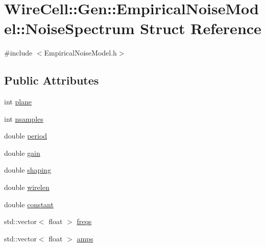 \hypertarget{struct_wire_cell_1_1_gen_1_1_empirical_noise_model_1_1_noise_spectrum}{}\section{Wire\+Cell\+:\+:Gen\+:\+:Empirical\+Noise\+Model\+:\+:Noise\+Spectrum Struct Reference}
\label{struct_wire_cell_1_1_gen_1_1_empirical_noise_model_1_1_noise_spectrum}


{\ttfamily \#include $<$Empirical\+Noise\+Model.\+h$>$}

\subsection*{Public Attributes}
\begin{DoxyCompactItemize}
\item 
int \hyperlink{struct_wire_cell_1_1_gen_1_1_empirical_noise_model_1_1_noise_spectrum_af4b3a452d3cc525401482d214132565a}{plane}
\item 
int \hyperlink{struct_wire_cell_1_1_gen_1_1_empirical_noise_model_1_1_noise_spectrum_a29ae414d6739f6d639dfee7e7540a404}{nsamples}
\item 
double \hyperlink{struct_wire_cell_1_1_gen_1_1_empirical_noise_model_1_1_noise_spectrum_aed82c7a61bd3901c3ad7dce02041f51e}{period}
\item 
double \hyperlink{struct_wire_cell_1_1_gen_1_1_empirical_noise_model_1_1_noise_spectrum_ad3b40eb570b2ccbb93fee79da5b4817c}{gain}
\item 
double \hyperlink{struct_wire_cell_1_1_gen_1_1_empirical_noise_model_1_1_noise_spectrum_ab76b726184c0744b3b16e8bc0483a662}{shaping}
\item 
double \hyperlink{struct_wire_cell_1_1_gen_1_1_empirical_noise_model_1_1_noise_spectrum_a866c884789cd4d3f14816584d4019be2}{wirelen}
\item 
double \hyperlink{struct_wire_cell_1_1_gen_1_1_empirical_noise_model_1_1_noise_spectrum_aba73b1c4021bd3a684e89a1d873cf4bb}{constant}
\item 
std\+::vector$<$ float $>$ \hyperlink{struct_wire_cell_1_1_gen_1_1_empirical_noise_model_1_1_noise_spectrum_a90d1860adb05adebe9650afd3e019f78}{freqs}
\item 
std\+::vector$<$ float $>$ \hyperlink{struct_wire_cell_1_1_gen_1_1_empirical_noise_model_1_1_noise_spectrum_a91705ef881cd5a2d5de2a09c397518da}{amps}
\end{DoxyCompactItemize}


